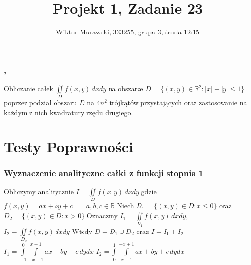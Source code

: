 \documentclass[9pt]{beamer}
\title{Projekt 1, Zadanie 23}
\author{Wiktor Murawski, 333255, grupa 3, środa 12:15}
\date{}
\newcommand{\n}{\newline}
\begin{document}
    \begin{frame}
        \frametitle{\insertauthor,\space\inserttitle}
        \begin{spacing}{2}
        Obliczanie całek $ \iint\limits_D f(x,y) \, dxdy $ na obszarze
        $  D = \{(x,y) \in \mathbb{R}^2 : |x| + |y| \leq 1\} $
        poprzez podział obszaru $ D $ na $ 4n^2 $ trójkątów przystających oraz
        zastosowanie na każdym z nich kwadratury rzędu drugiego.
        \end{spacing}
    \end{frame}

	\section{Testy Poprawności}
	\begin{frame}
		\frametitle{Wyznaczenie analityczne całki z funkcji stopnia 1}

        \begin{spacing}{2}
        Obliczymy analitycznie $ I = \iint\limits_D f(x,y) \, dx dy $ gdzie
        $ f(x,y) = ax + by + c \qquad a,b,c \in \mathbb{R}$ \n
        Niech $ D_1 = \{(x,y) \in D : x \leq 0\} $ oraz $ D_2 = \{(x,y) \in D : x > 0\} $ \n
        Oznaczmy $ I_1 = \iint\limits_{D_1} f(x,y) \, dx dy $, $ I_2 = \iint\limits_{D_2} f(x,y) \, dx dy $ \n
        Wtedy $ D = D_1 \cup D_2 $ oraz $ I = I_1 + I_2 $ \n
        $ I_1 = \int\limits_{-1}^{0}\int\limits_{-x-1}^{x+1} ax+by+c \, dy dx $ \qquad\n
        $ I_2 = \int\limits_{0}^{1}\int\limits_{x-1}^{-x+1} ax+by+c \, dy dx $ \n
        \end{spacing}

	\end{frame}
\end{document}
